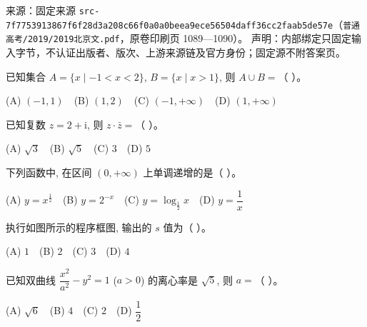 
\begin{gktip}
来源：固定来源 \texttt{src-7f7753913867f6f28d3a208c66f0a0a0beea9ece56504daff36cc2faab5de57e}（\texttt{普通高考/2019/2019北京文.pdf}，原卷印刷页 1089—1090）。
声明：内部绑定只固定输入字节，不认证出版者、版次、上游来源链及官方身份；固定源不附答案页。
\end{gktip}

\par\medskip


\begin{question}
已知集合 $A = \{x \mid -1 < x < 2\}$, $B = \{x \mid x > 1\}$, 则 $A \cup B =$（ ）。

(A) $(-1, 1)$　(B) $(1, 2)$　(C) $(-1, +\infty)$　(D) $(1, +\infty)$

\end{question}
\begin{question}
已知复数 $z = 2 + \mathrm{i}$, 则 $z \cdot \bar{z} =$（ ）。

(A) $\sqrt{3}$　(B) $\sqrt{5}$　(C) $3$　(D) $5$

\end{question}
\begin{question}
下列函数中, 在区间 $(0, +\infty)$ 上单调递增的是（ ）。

(A) $y = x^{\frac{1}{2}}$　(B) $y = 2^{-x}$　(C) $y = \log_{\frac{1}{2}} x$　(D) $y = \dfrac{1}{x}$

\Needspace{0.4\textheight}
\end{question}
\begin{question}
执行如图所示的程序框图, 输出的 $s$ 值为（ ）。
\nopagebreak[4]
\begin{center}\end{center}
\nopagebreak[4]
(A) $1$　(B) $2$　(C) $3$　(D) $4$

\end{question}
\begin{question}
已知双曲线 $\dfrac{x^2}{a^2} - y^2 = 1$ ($a > 0$) 的离心率是 $\sqrt{5}$, 则 $a =$（ ）。

(A) $\sqrt{6}$　(B) $4$　(C) $2$　(D) $\dfrac{1}{2}$

\end{question}

